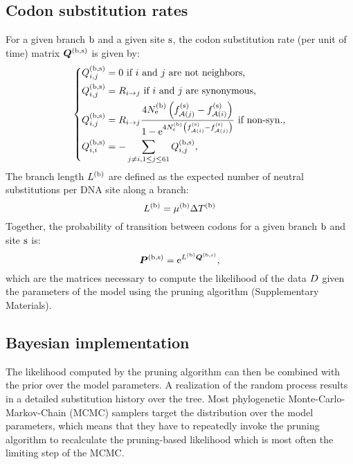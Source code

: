 \subsection{Codon substitution rates}
For a given branch $\text{b}$ and a given site $\text{s}$, the codon substitution rate (per unit of time) matrix $\bm{Q}^{(\text{b}, \text{s})}$ is given by:
\begin{equation}
\label{eq:subrates}
\begin{dcases}
\submatrix\branchsiteexp_{\itoj} = 0\text{ if $\ci$ and $\cj$ are not neighbors,} \\
\submatrix\branchsiteexp_{\itoj} = \mutmatrix_{\nucitoj}\text{ if $\ci$ and $\cj$ are synonymous,} \\
\submatrix\branchsiteexp_{\itoj} = \mutmatrix_{\nucitoj} \dfrac{4\Ne\branchexp \left({\fitj\siteexp - \fiti\siteexp}\right)}{{1 - \e^{4\Ne\branchexp\left({\fiti\siteexp - \fitj\siteexp}\right)} }} \text{ if non-syn.,}\\
\submatrix\branchsiteexp_{\ci, \ci} = - \sum_{ \cj \neq \ci, \jSetCodon} \submatrix\branchsiteexp_{\itoj},
\end{dcases}
\end{equation}
The branch length $L^{(\text{b})}$ are defined as the expected number of neutral substitutions per DNA site along a branch:
\begin{equation}
\label{eq:branchlength}
\branchlength\branchexp = \mu\branchexp \branchtime\branchexp
\end{equation}
Together, the probability of transition between codons for a given branch $\text{b}$ and site $\text{s}$ is:
\begin{equation}
\label{eq:Probmatrix}
\Probmatrix\branchsiteexp = \e^{\branchlength\branchexp \Submatrix\branchsiteexp},
\end{equation}
which are the matrices necessary to compute the likelihood of the data $D$ given the parameters of the model using the pruning algorithm (Supplementary Materials).

\subsection{Bayesian implementation}
\label{sec:Bayesian}
The likelihood computed by the pruning algorithm can then be combined with the prior over the model parameters.
A realization of the random process results in a detailed substitution history over the tree.
Most phylogenetic Monte-Carlo-Markov-Chain (MCMC) samplers target the distribution over the model parameters, which means that they have to repeatedly invoke the pruning algorithm to recalculate
the pruning-based likelihood which is most often the limiting step of the MCMC.

